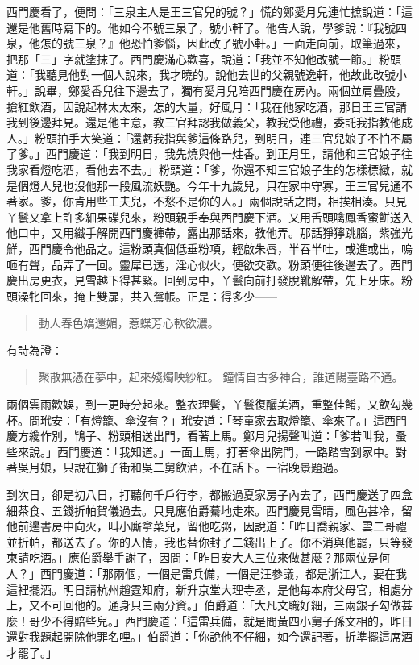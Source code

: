 西門慶看了，便問：「三泉主人是王三官兒的號？」慌的鄭愛月兒連忙摭說道：「這還是他舊時寫下的。他如今不號三泉了，號小軒了。他告人說，學爹說：『我號四泉，他怎的號三泉？』他恐怕爹惱，因此改了號小軒。」一面走向前，取筆過來，把那「三」字就塗抹了。西門慶滿心歡喜，說道：「我並不知他改號一節。」粉頭道：「我聽見他對一個人說來，我才曉的。說他去世的父親號逸軒，他故此改號小軒。」說畢，鄭愛香兒往下邊去了，獨有愛月兒陪西門慶在房內。兩個並肩疊股，搶紅飲酒，因說起林太太來，怎的大量，好風月：「我在他家吃酒，那日王三官請我到後邊拜見。還是他主意，教三官拜認我做義父，教我受他禮，委託我指教他成人。」粉頭拍手大笑道：「還虧我指與爹這條路兒，到明日，連三官兒娘子不怕不屬了爹。」西門慶道：「我到明日，我先燒與他一炷香。到正月里，請他和三官娘子往我家看燈吃酒，看他去不去。」粉頭道：「爹，你還不知三官娘子生的怎樣標緻，就是個燈人兒也沒他那一段風流妖艷。今年十九歲兒，只在家中守寡，王三官兒通不著家。爹，你肯用些工夫兒，不愁不是你的人。」兩個說話之間，相挨相湊。只見丫鬟又拿上許多細果碟兒來，粉頭親手奉與西門慶下酒。又用舌頭噙鳳香蜜餅送入他口中，又用纖手解開西門慶褲帶，露出那話來，教他弄。那話猙獰跳腦，紫強光鮮，西門慶令他品之。這粉頭真個低垂粉項，輕啟朱唇，半吞半吐，或進或出，嗚咂有聲，品弄了一回。靈犀已透，淫心似火，便欲交歡。粉頭便往後邊去了。西門慶出房更衣，見雪越下得甚緊。回到房中，丫鬟向前打發脫靴解帶，先上牙床。粉頭澡牝回來，掩上雙扉，共入鴛帳。正是：得多少——
\begin{quote}
動人春色嬌還媚，惹蝶芳心軟欲濃。
\end{quote}
有詩為證：
\begin{quote}
聚散無憑在夢中，起來殘燭映紗紅。
鐘情自古多神合，誰道陽臺路不通。
\end{quote}

兩個雲雨歡娛，到一更時分起來。整衣理鬢，丫鬟復釃美酒，重整佳餚，又飲勾幾杯。問玳安：「有燈籠、傘沒有？」玳安道：「琴童家去取燈籠、傘來了。」這西門慶方纔作別，鴇子、粉頭相送出門，看著上馬。鄭月兒揚聲叫道：「爹若叫我，蚤些來說。」西門慶道：「我知道。」一面上馬，打著傘出院門，一路踏雪到家中。對著吳月娘，只說在獅子街和吳二舅飲酒，不在話下。一宿晚景題過。

到次日，卻是初八日，打聽何千戶行李，都搬過夏家房子內去了，西門慶送了四盒細茶食、五錢折帕賀儀過去。只見應伯爵驀地走來。西門慶見雪晴，風色甚冷，留他前邊書房中向火，叫小廝拿菜兒，留他吃粥，因說道：「昨日喬親家、雲二哥禮並折帕，都送去了。你的人情，我也替你封了二錢出上了。你不消與他罷，只等發柬請吃酒。」應伯爵舉手謝了，因問：「昨日安大人三位來做甚麼？那兩位是何人？」西門慶道：「那兩個，一個是雷兵備，一個是汪參議，都是浙江人，要在我這裡擺酒。明日請杭州趙霆知府，新升京堂大理寺丞，是他每本府父母官，相處分上，又不可回他的。通身只三兩分資。」伯爵道：「大凡文職好細，三兩銀子勾做甚麼！哥少不得賠些兒。」西門慶道：「這雷兵備，就是問黃四小舅子孫文相的，昨日還對我題起開除他罪名哩。」伯爵道：「你說他不仔細，如今還記著，折準擺這席酒才罷了。」

